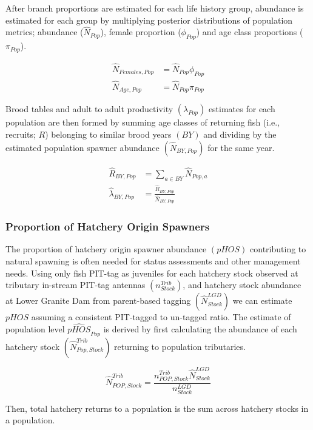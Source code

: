 \documentclass[]{article}
\begin{document}
After branch proportions are estimated for each life history group,
abundance is estimated for each group by multiplying posterior
distributions of population metrics; abundance (\(\hat{N}_{Pop}\)),
female proportion (\(\phi_{Pop}\)) and age class proportions
(\(\pi_{Pop}\)).

\[
\begin{aligned}
\hat{N}_{Females,Pop} &= \hat{N}_{Pop} \phi_{Pop} \\ 
\hat{N}_{Age,Pop} &= \hat{N}_{Pop} \pi_{Pop}
\end{aligned}
\]

Brood tables and adult to adult productivity \((\lambda_{Pop})\)
estimates for each population are then formed by summing age classes of
returning fish (i.e., recruits; \(R\)) belonging to similar brood years
\((BY)\) and dividing by the estimated population spawner abundance
\((\hat{N}_{BY,Pop})\) for the same year.

\[
\begin{aligned}
\hat{R}_{BY,Pop} &= \sum_{a \in BY} \hat{N}_{Pop,a} \\
\hat{\lambda}_{BY,Pop} &= \frac{\hat{R}_{BY,Pop}}{\hat{N}_{BY,Pop}}
\end{aligned}
\]

\hypertarget{proportion-of-hatchery-origin-spawners}{%
\subsubsection{Proportion of Hatchery Origin
Spawners}\label{proportion-of-hatchery-origin-spawners}}

The proportion of hatchery origin spawner abundance \((pHOS)\)
contributing to natural spawning is often needed for status assessments
and other management needs. Using only fish PIT-tag as juveniles for
each hatchery stock observed at tributary in-stream PIT-tag antennas
\((n^{Trib}_{Stock})\), and hatchery stock abundance at Lower Granite
Dam from parent-based tagging \((\hat{N}^{LGD}_{Stock})\) we can
estimate \(pHOS\) assuming a consistent PIT-tagged to un-tagged ratio.
The estimate of population level \(\hat{pHOS}_{Pop}\) is derived by
first calculating the abundance of each hatchery stock
\((\hat{N}^{Trib}_{Pop,Stock})\) returning to population tributaries.

\[
\hat{N}^{Trib}_{POP,Stock} = \frac{n^{Trib}_{POP,Stock}\hat{N}^{LGD}_{Stock}}{n^{LGD}_{Stock}}
\]

Then, total hatchery returns to a population is the sum across hatchery
stocks in a population.
\end{document}
